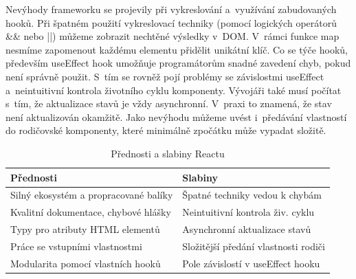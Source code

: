 Nevýhody frameworku se projevily při vykreslování a~využívání zabudovaných hooků. 
Při špatném použití vykreslovací techniky (pomocí logických operátorů \&\& nebo ||) můžeme zobrazit nechtěné výsledky v~DOM. 
V~rámci funkce map nesmíme zapomenout každému elementu přidělit unikátní klíč. 
Co se týče hooků, především useEffect hook umožňuje programátorům snadné zavedení chyb, pokud není správně použit. 
S~tím se rovněž pojí problémy se závislostmi useEffect a~neintuitivní kontrola životního cyklu komponenty. 
Vývojáři také musí počítat s~tím, že aktualizace stavů je vždy asynchronní. V~praxi to znamená, že stav není aktualizován okamžitě. 
Jako nevýhodu můžeme uvést i~předávání vlastností do rodičovské komponenty, které minimálně zpočátku může vypadat složitě.

\begin{table}[htb]
	\centering
	\caption{Přednosti a slabiny Reactu}
	\medskip
	\radkovani[1.2]
		\begin{tabular}{|l|l|}
		\hline
		\textbf{Přednosti}											& \textbf{Slabiny}                    	\\ \hline
		Silný ekosystém a propracované balíky		& Špatné techniky vedou k chybám 				\\ \hline
		Kvalitní dokumentace, chybové hlášky		& Neintuitivní kontrola živ. cyklu   		\\ \hline
		Typy pro atributy HTML elementů					& Asynchronní aktualizace stavů					\\ \hline
		Práce se vstupními vlastnostmi					& Složitější předání vlastnosti rodiči	\\ \hline
		Modularita pomocí vlastních hooků				& Pole závislostí v useEffect hooku			\\ \hline
		\end{tabular}
	\label{tab:reacttabulka}
\end{table}


